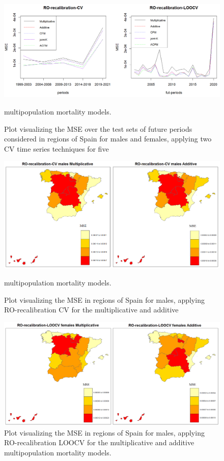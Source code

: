 \begin{figure}[h!]
\centering
\includegraphics*[width=\textwidth]{MSE_futpers.png}
\caption{Plot visualizing the MSE over the test sets of future periods considered in regions of Spain for males and females, applying two CV time series techniques for five} multipopulation mortality models.
\label{MSE_per}
\end{figure}

\begin{figure}[h!]
\centering
\includegraphics*[width=\textwidth]{blocked_MSE_males.png}
\caption{Plot visualizing the MSE in regions of Spain for males, applying RO-recalibration CV for the multiplicative and additive} multipopulation mortality models.
\label{MSE_block}
\end{figure}

\begin{figure}[h!]
\centering
\includegraphics*[width=\textwidth]{LOOCV_MSE_females.png}
\caption{Plot visualizing the MSE in regions of Spain for males, applying RO-recalibration LOOCV for the multiplicative and additive multipopulation mortality models.}
\label{MSE_loocv}
\end{figure}


